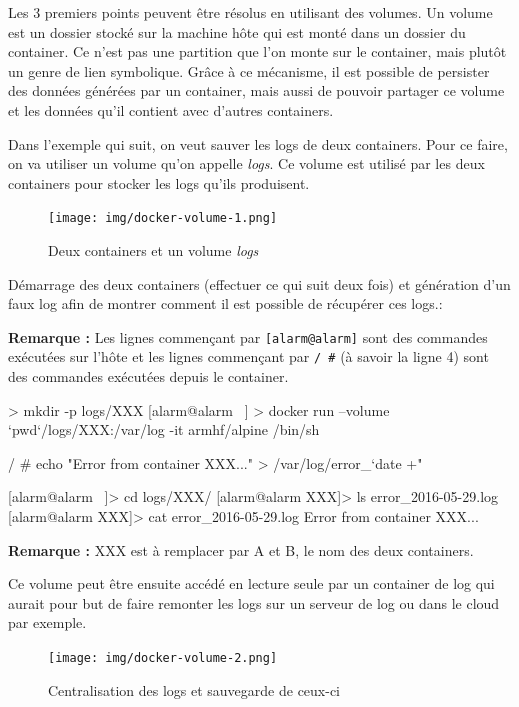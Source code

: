 \documentclass[11pt,a4paper,oneside]{report}
\newcommand{\code}[1]{\texttt{#1}}
\begin{document}
Les 3 premiers points peuvent être résolus en utilisant des volumes. Un volume est un dossier stocké sur la machine hôte qui est monté dans un dossier du container. Ce n'est pas une partition que l'on monte sur le container, mais plutôt un genre de lien symbolique. Grâce à ce mécanisme, il est possible de persister des données générées par un container, mais aussi de pouvoir partager ce volume et les données qu'il contient avec d'autres containers.

Dans l'exemple qui suit, on veut sauver les logs de deux containers. Pour ce faire, on va utiliser un volume qu'on appelle \textit{logs}. Ce volume est utilisé par les deux containers pour stocker les logs qu'ils produisent.

\begin{figure}[H]
\centering
\texttt{[image: img/docker-volume-1.png]}
\caption{Deux containers et un volume \textit{logs}}
\end{figure}

Démarrage des deux containers (effectuer ce qui suit deux fois) et génération d'un faux log afin de montrer comment il est possible de récupérer ces logs.:

\textbf{Remarque :} Les lignes commençant par \code{[alarm@alarm]} sont des commandes exécutées sur l'hôte et les lignes commençant par \code{/ \#} (à savoir la ligne 4) sont des commandes exécutées depuis le container.

\begin{bashcode}
 > mkdir -p logs/XXX
[alarm@alarm ~] > docker run --volume `pwd`/logs/XXX:/var/log -it armhf/alpine /bin/sh

/ # echo "Error from container XXX..." > /var/log/error_`date +"%

[alarm@alarm ~]> cd logs/XXX/
[alarm@alarm XXX]> ls
error_2016-05-29.log
[alarm@alarm XXX]> cat error_2016-05-29.log
Error from container XXX...
\end{bashcode}

\textbf{Remarque :} XXX est à remplacer par A et B, le nom des deux containers.

Ce volume peut être ensuite accédé en lecture seule par un container de log qui aurait pour but de faire remonter les logs sur un serveur de log ou dans le cloud par exemple.

\begin{figure}[H]
\centering
\texttt{[image: img/docker-volume-2.png]}
\caption{Centralisation des logs et sauvegarde de ceux-ci}
\end{figure}
\end{document}
